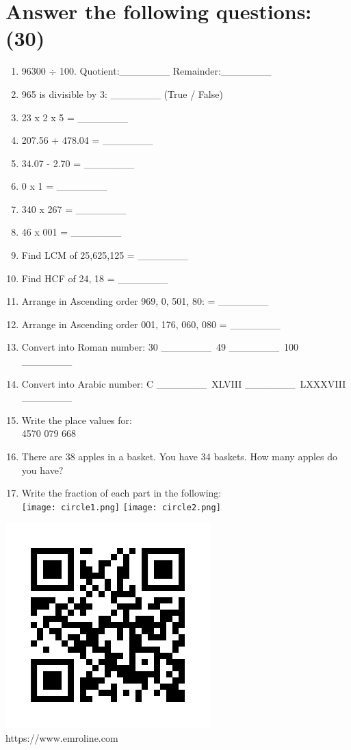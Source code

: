 \documentclass[12pt,a4paper]{article}
\begin{document}
\section*{Answer the following questions: (30)}
\begin{enumerate}
    \item 96300 $\div$ 100. Quotient:\_\_\_\_\_\_\_ Remainder:\_\_\_\_\_\_\_
    \item 965 is divisible by 3: \_\_\_\_\_\_\_ (True / False)
    \item 23 x 2 x 5 = \_\_\_\_\_\_\_
    \item 207.56 + 478.04 = \_\_\_\_\_\_\_
    \item 34.07 - 2.70 = \_\_\_\_\_\_\_
    \item 0 x 1 = \_\_\_\_\_\_\_
    \item 340 x 267 = \_\_\_\_\_\_\_
    \item 46 x 001 = \_\_\_\_\_\_\_
    \item Find LCM of 25,625,125 = \_\_\_\_\_\_\_
    \item Find HCF of 24, 18 = \_\_\_\_\_\_\_
    \item Arrange in Ascending order 969, 0, 501, 80: = \_\_\_\_\_\_\_ 
    \item Arrange in Ascending order 001, 176, 060, 080 = \_\_\_\_\_\_\_
    \item Convert into Roman number: 30 \_\_\_\_\_\_\_\, 49 \_\_\_\_\_\_\_\, 100 \_\_\_\_\_\_\_
    \item Convert into Arabic number: C \_\_\_\_\_\_\_\, XLVIII \_\_\_\_\_\_\_\, LXXXVIII \_\_\_\_\_\_\_
    \item Write the place values for: \\
    4570 \hspace{150} 079 \hspace{150} 668
    \item There are 38 apples in a basket. You have 34 baskets. How many apples do you have?
    \item Write the fraction of each part in the following:\\ \texttt{[image: circle1.png]}\hspace{80} \texttt{[image: circle2.png]}
    
\end{enumerate} 
\vfill 
\begin{center}
\includegraphics[width=0.15\linewidth]{frame.png}\\
\caption{https://www.emroline.com}
\end{center}
\vspace{1cm}
\end{document}
